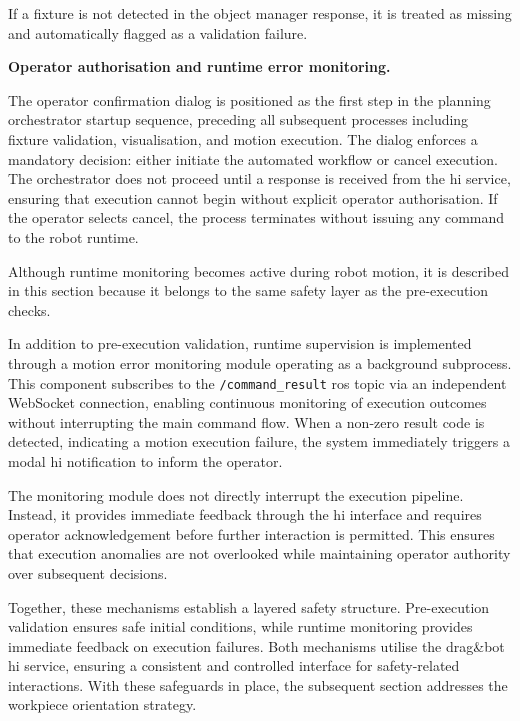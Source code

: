 If a fixture is not detected in the object manager response, it is treated as missing and automatically flagged as a validation failure.

\label{sec:operator-authorisation-runtime-monitoring}
\noindent\textbf{Operator authorisation and runtime error monitoring.}

The operator confirmation dialog is positioned as the first step in the planning orchestrator startup sequence, preceding all subsequent processes including fixture validation, visualisation, and motion execution. The dialog enforces a mandatory decision: either initiate the automated workflow or cancel execution. The orchestrator does not proceed until a response is received from the \acs{hi} service, ensuring that execution cannot begin without explicit operator authorisation. If the operator selects cancel, the process terminates without issuing any command to the robot runtime.

Although runtime monitoring becomes active during robot motion, it is described in this section because it belongs to the same safety layer as the pre-execution checks.

In addition to pre-execution validation, runtime supervision is implemented through a motion error monitoring module operating as a background subprocess. This component subscribes to the \texttt{/command\_result} \ac{ros} topic via an independent WebSocket connection, enabling continuous monitoring of execution outcomes without interrupting the main command flow. When a non-zero result code is detected, indicating a motion execution failure, the system immediately triggers a modal \acs{hi} notification to inform the operator.

The monitoring module does not directly interrupt the execution pipeline. Instead, it provides immediate feedback through the \acs{hi} interface and requires operator acknowledgement before further interaction is permitted. This ensures that execution anomalies are not overlooked while maintaining operator authority over subsequent decisions.

Together, these mechanisms establish a layered safety structure. Pre-execution validation ensures safe initial conditions, while runtime monitoring provides immediate feedback on execution failures. Both mechanisms utilise the drag\&bot \acs{hi} service, ensuring a consistent and controlled interface for safety-related interactions. With these safeguards in place, the subsequent section addresses the workpiece orientation strategy.


